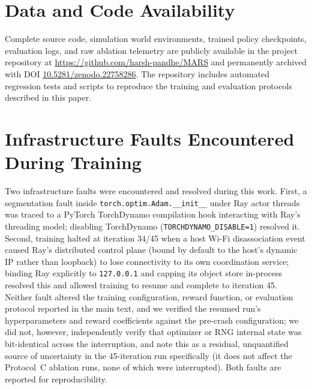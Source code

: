 \documentclass[11pt]{article}
\begin{document}
\section*{Data and Code Availability}
Complete source code, simulation world environments, trained policy checkpoints,
evaluation logs, and raw ablation telemetry are publicly available in the project
repository at \url{https://github.com/harsh-pandhe/MARS} and permanently archived
with DOI \href{https://doi.org/10.5281/zenodo.22758286}{10.5281/zenodo.22758286}.
The repository includes automated regression tests and scripts to reproduce the
training and evaluation protocols described in this paper.

\appendix
\section{Infrastructure Faults Encountered During Training}
Two infrastructure faults were encountered and resolved during this work.
First, a segmentation fault inside \texttt{torch.optim.Adam.\_\_init\_\_}
under Ray actor threads was traced to a PyTorch TorchDynamo compilation
hook interacting with Ray's threading model; disabling TorchDynamo
(\texttt{TORCHDYNAMO\_DISABLE=1}) resolved it. Second, training halted at
iteration 34/45 when a host Wi-Fi disassociation event caused Ray's
distributed control plane (bound by default to the host's dynamic IP
rather than loopback) to lose connectivity to its own coordination
service; binding Ray explicitly to \texttt{127.0.0.1} and capping its
object store in-process resolved this and allowed training to resume and
complete to iteration 45. Neither fault altered the training
configuration, reward function, or evaluation protocol reported in the
main text, and we verified the resumed run's hyperparameters and reward
coefficients against the pre-crash configuration; we did not, however,
independently verify that optimizer or RNG internal state was bit-identical
across the interruption, and note this as a residual, unquantified source
of uncertainty in the 45-iteration run specifically (it does not affect
the Protocol~C ablation runs, none of which were interrupted). Both faults
are reported for reproducibility.
\end{document}
